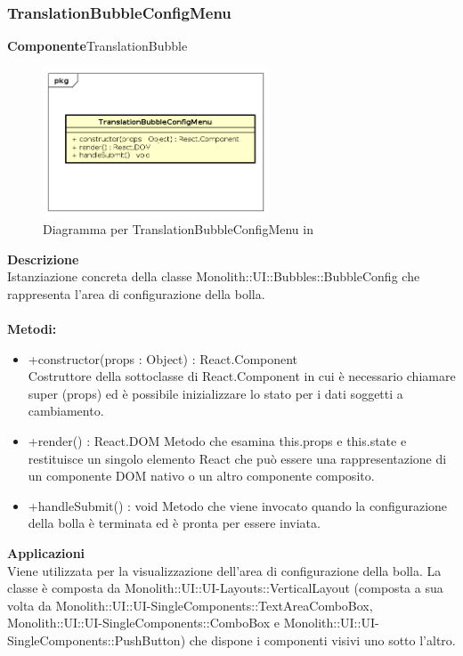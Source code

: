 \subsubsection{TranslationBubbleConfigMenu}
\textbf{Componente}TranslationBubble\\
   \FloatBarrier
   \begin{figure}[ht]
   \centering
   \includegraphics[width=0.6\textwidth]{img/single-TranslationBubbleConfigMenu}
   \caption{{Diagramma per TranslationBubbleConfigMenu in }}
\end{figure}
\FloatBarrier
\textbf{Descrizione}\\
Istanziazione concreta della classe Monolith::UI::Bubbles::BubbleConfig che rappresenta l'area di configurazione della bolla. 
\\
\\
\textbf{Metodi:} 
\begin{itemize}
\item +constructor(props : Object) : React.Component 
\\
Costruttore della sottoclasse di React.Component in cui è necessario chiamare super (props) ed è possibile inizializzare lo stato per i dati soggetti a cambiamento.

\item +render() : React.DOM
Metodo che esamina this.props e this.state e restituisce un singolo elemento React che può essere una rappresentazione di un componente DOM nativo o un altro componente composito.

\item +handleSubmit() : void
Metodo che viene invocato quando la configurazione della bolla è terminata ed è pronta per essere inviata.

\end{itemize} 


\textbf{Applicazioni}\\
Viene utilizzata per la visualizzazione dell'area di configurazione della bolla. 
La classe è composta da Monolith::UI::UI-Layouts::VerticalLayout (composta a sua volta da Monolith::UI::UI-SingleComponents::TextAreaComboBox, Monolith::UI::UI-SingleComponents::ComboBox e Monolith::UI::UI-SingleComponents::PushButton) che dispone i componenti visivi uno sotto l'altro. 


